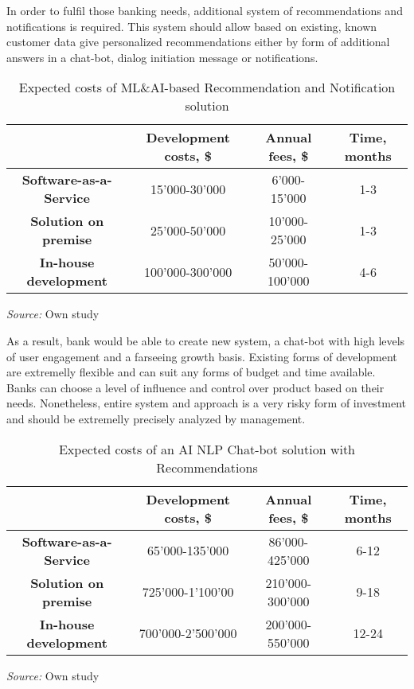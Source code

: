 In order to fulfil those banking needs, additional system of recommendations and notifications is required.
This system should allow based on existing, known customer data give personalized recommendations either by form of additional answers in a chat-bot, dialog initiation message or notifications.

\begin{table}
    \centering
    \begin{tabular}{| c | c | c | c |}
        \hline
        &
        \textbf{Development costs, \$} & 
        \textbf{Annual fees, \$} &
        \textbf{Time, months} \\ \hline 
       
        \textbf{Software-as-a-Service} & 
            15'000-30'000 & 
            6'000-15'000 &
            1-3 \\ \hline 
       
        \textbf{Solution on premise} & 
            25'000-50'000 &
            10'000-25'000 &
            1-3 \\ \hline 
            
        \textbf{In-house development} &
            100'000-300'000 &
            50'000-100'000 &
            4-6 \\ \hline
    \end{tabular}
    \caption{Expected costs of ML\&AI-based Recommendation and Notification solution}
    \medskip
    \footnotesize\textit{Source:} Own study
\end{table}

As a result, bank would be able to create new system, a chat-bot with high levels of user engagement and a farseeing growth basis.
Existing forms of development are extremelly flexible and can suit any forms of budget and time available.
Banks can choose a level of influence and control over product based on their needs.
Nonetheless, entire system and approach is a very risky form of investment and should be extremelly precisely analyzed by management.

\begin{table}
    \centering
    \begin{tabular}{| c | c | c | c |}
        \hline
        &
        \textbf{Development costs, \$} & 
        \textbf{Annual fees, \$} &
        \textbf{Time, months} \\ \hline 
       
        \textbf{Software-as-a-Service} & 
            65'000-135'000 & 
            86'000-425'000 &
            6-12 \\ \hline 
       
        \textbf{Solution on premise} & 
            725'000-1'100'00 &
            210'000-300'000 &
            9-18 \\ \hline 
            
        \textbf{In-house development} &
            700'000-2'500'000 &
            200'000-550'000 &
            12-24 \\ \hline
    \end{tabular}
    \caption{Expected costs of an AI NLP Chat-bot solution with Recommendations}
    \medskip
    \footnotesize\textit{Source:} Own study
\end{table}
